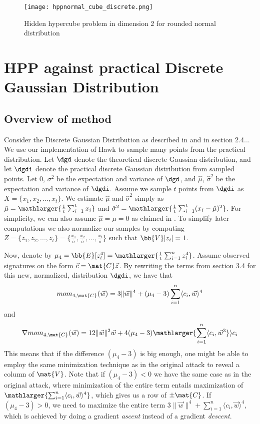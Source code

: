 \begin{figure}[H]
    \centering
    \texttt{[image: hppnormal\_cube\_discrete.png]}
    \caption{Hidden hypercube problem in dimension 2 for rounded normal distribution}
  	\medskip 
    \label{hypercube_normal_discrete}
\end{figure}
\section{HPP against practical Discrete Gaussian Distribution}
\subsection{Overview of method}
Consider the Discrete Gaussian Distribution as described in \cite{HawkSpec24} and in section 2.4... We use our implementation of Hawk to sample many points from the practical distribution.
Let $\dgd$ denote the theoretical discrete Gaussian distribution, and let $\dgdi$ denote the practical discrete Gaussian distribution from sampled points.
Let $0$, $\sigma^2$ be the expectation and variance of $\dgd$, and $\hat{\mu}$, $\hat{\sigma}^2$ be the expectation and variance of $\dgdi$.
Assume we sample $t$ points from $\dgdi$ as $X = \{x_1, x_2, ..., x_t\}$. We estimate $\hat{\mu}$ and $\hat{\sigma}^2$ simply as $\hat{\mu} = \mathlarger{\frac{1}{t} \sum_{i=1}^{t} x_i}$ and $\hat{\sigma}^2 = \mathlarger{\frac{1}{t} \sum_{i=1}^{t}(x_i - \hat{\mu})^2}$.
For simplicity, we can also assume $\hat{\mu} = \mu = 0$ as claimed in \cite{HawkSpec24}.
To simplify later computations we also normalize our samples by computing $Z = \{z_1, z_2, ..., z_t\} = \{\frac{x_1}{\hat{\sigma}}, \frac{x_2}{\hat{\sigma}},..., \frac{x_t}{\hat{\sigma}}\}$ such that 
$\bb{V}[z_i] = 1$.


Now, denote by $\mu_4 = \bb{E}[z_i^4] = \mathlarger{\frac{1}{t} \sum_{i=1}^{n} z_i ^4}$. Assume observed signatures on the form $\vec{c} = \mat{C} \vec{z}$. By rewriting the terms from section 3.4 for this new, normalized, distribution $\dgdi$, we have that
\[mom_{4, \mat{C}} (\vec{w}) = 3 \lVert \vec{w} \rVert ^4 + (\mu_4 - 3) \sum_{i=1}^{n} \langle c_i, \vec{w} \rangle^4 \]
and
\[\nabla mom_{4, \mat{C}} (\vec{w}) = 12 \lVert \vec{w} \rVert^2 \vec{w} + 4(\mu_4 - 3) \mathlarger{\sum_{i=1}^{n} \langle c_i, \vec{w}^3} \rangle c_i\]
This means that if the difference $(\mu_4 - 3)$ is big enough, one might be able to employ the same minimization technique as in the original attack to reveal a column of $\mat{V}$.
Note that if $(\mu_4 - 3) < 0$ we have the same case as in the original attack, where minimization of the entire term entails maximization of $\mathlarger{\sum_{i=1}^{n} \langle c_i, \vec{w} \rangle^4}$, which gives us a row of $\pm \mat{C}$.
If $(\mu_4 - 3) > 0$, we need to maximize the entire term $3 \lVert \vec{w} \rVert ^4 + \sum_{i=1}^{n} \langle c_i, \vec{w} \rangle^4$, which is achieved by doing a gradient \textit{ascent} instead of a gradient \textit{descent}.

